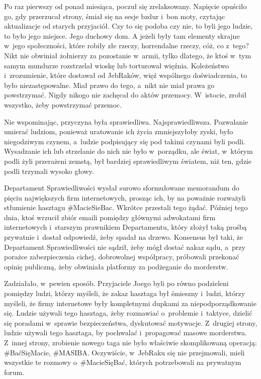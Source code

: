 \documentclass[oneside,polish,11pt,sfheadings]{mwbk}
\begin{document}
Po raz pierwszy od ponad miesiąca, poczuł się zrelaksowany. Napięcie
opuściło go, gdy przerzucał strony, śmiał się na sesje bzdur i~bon moty,
czytając aktualizacje od starych przyjaciół. Czy to się podoba czy nie,
to byli jego ludzie, to było jego miejsce. Jego duchowy dom. A jeżeli
były tam elementy skrajne w~jego społeczności, które robiły złe rzeczy,
horrendalne rzeczy, cóż, co z~tego? Nikt nie obwiniał żołnierzy za
pozostanie w~armii, tylko dlatego, że ktoś w~tym samym mundurze
rozstrzelał wioskę lub torturował więźnia. Koleżeństwo i~zrozumienie,
które dostawał od JebRaków, więź wspólnego doświadczenia, to było
niezastępowalne. Miał prawo do tego, a~nikt nie miał prawa go
powstrzymać. Nigdy nikogo nie zachęcał do aktów przemocy. W~istocie,
zrobił wszystko, żeby powstrzymać przemoc.

Nie wspominając, przyczyna była sprawiedliwa. Najsprawiedliwsza.
Pozwalanie umierać ludziom, ponieważ uratowanie ich życia zmniejszyłoby
zyski, było niegodziwym czynem, a~ludzie podpisujący się pod takimi
czynami byli podli. Wysadzanie ich lub strzelanie do nich nie było w~porządku, ale świat, w~którym podli żyli przerażeni zemstą, był bardziej
sprawiedliwym światem, niż ten, gdzie podli trzymali wysoko głowy.

Departament Sprawiedliwości wysłał surowo sformułowane memorandum do
pięciu największych firm internetowych, prosząc ich, by na poważnie
rozważyli stłumienie hasztagu \#MacieSieBac. Wkrótce przestali tego
żądać. Później tego dnia, ktoś wrzucił zbiór emaili pomiędzy głównymi
adwokatami firm internetowych i~starszym prawnikiem Departamentu, który
złożył taką prośbą prywatnie i~dostał odpowiedź, żeby spadał na drzewo.
Konsensus był taki, że Departament Sprawiedliwości nie sądził, żeby mógł
dostać nakaz sądu, a~przy porażce zabezpieczenia cichej, dobrowolnej
współpracy, próbowali przekonać opinię publiczną, żeby obwiniała
platformy za podżeganie do morderstw.

Zadziałało, w~pewien sposób. Przyjaciele Joego byli po równo podzieleni
pomiędzy ludzi, którzy myśleli, że zakaz hasztaga był śmieszny i~ludzi,
którzy myśleli, że firmy internetowe były kompletnymi dupkami za
niepodporządkowanie się. Ludzie używali tego hasztaga, żeby rozmawiać o~problemie i~taktyce, dzielić się poradami w~sprawie bezpieczeństwa,
dyskutować motywacje. Z~drugiej strony, ludzie używali tego hasztaga, by
pochwalać i~propagować masowe morderstwa. Z~innej strony, zrobienie
nowego taga nie było właściwie skomplikowaną operacją: \#BaćSięMacie,
\#MASIBA. Oczywiście, w~JebRaku się nie przejmowali, mieli wszystkie te
rozmowy o~\#MacieSięBać, których potrzebowali na prywatnym forum.
\end{document}
